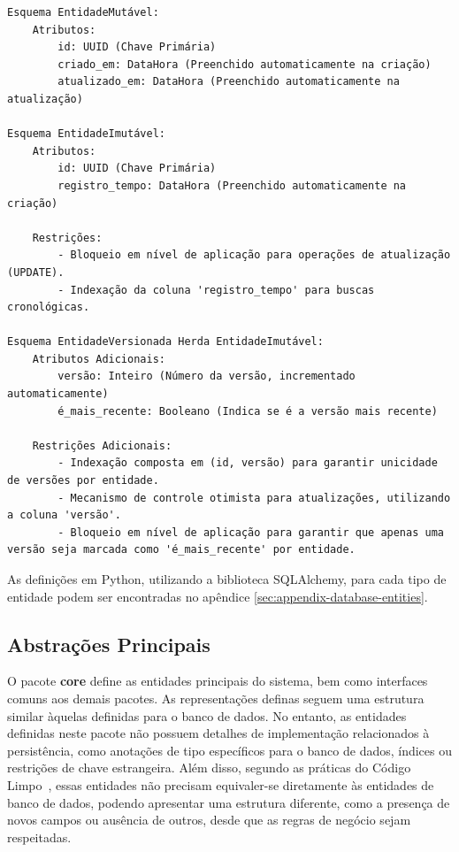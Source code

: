 \begin{lstlisting}[style=pseudocodigo, caption={Definição, em pseudo-código, de uma entidade mutável, imutável e versionada em nível de banco de dados}, label={code:db_entities}]
Esquema EntidadeMutável:
    Atributos:
        id: UUID (Chave Primária)
        criado_em: DataHora (Preenchido automaticamente na criação)
        atualizado_em: DataHora (Preenchido automaticamente na atualização)

Esquema EntidadeImutável:
    Atributos:
        id: UUID (Chave Primária)
        registro_tempo: DataHora (Preenchido automaticamente na criação)

    Restrições:
        - Bloqueio em nível de aplicação para operações de atualização (UPDATE).
        - Indexação da coluna 'registro_tempo' para buscas cronológicas.

Esquema EntidadeVersionada Herda EntidadeImutável:
    Atributos Adicionais:
        versão: Inteiro (Número da versão, incrementado automaticamente)
        é_mais_recente: Booleano (Indica se é a versão mais recente)

    Restrições Adicionais:
        - Indexação composta em (id, versão) para garantir unicidade de versões por entidade.
        - Mecanismo de controle otimista para atualizações, utilizando a coluna 'versão'.
        - Bloqueio em nível de aplicação para garantir que apenas uma versão seja marcada como 'é_mais_recente' por entidade.
\end{lstlisting}

As definições em Python, utilizando a biblioteca SQLAlchemy, para cada tipo de entidade podem ser encontradas no apêndice \ref{sec:appendix-database-entities}.

\subsection{Abstrações Principais}
O pacote \textbf{core} define as entidades principais do sistema, bem como interfaces comuns aos demais pacotes. As representações definas seguem uma estrutura similar àquelas definidas para o banco de dados. No entanto, as entidades definidas neste pacote não possuem detalhes de implementação relacionados à persistência, como anotações de tipo específicos para o banco de dados, índices ou restrições de chave estrangeira. Além disso, segundo as práticas do Código Limpo~\cite{martin2008clean}, essas entidades não precisam equivaler-se diretamente às entidades de banco de dados, podendo apresentar uma estrutura diferente, como a presença de novos campos ou ausência de outros, desde que as regras de negócio sejam respeitadas.

